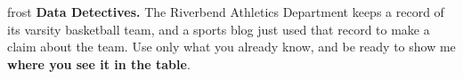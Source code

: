 \documentclass[12pt]{article}
\begin{document}

\vspace{0.06in}

\begin{headlinebox}{frost}
\textbf{Data Detectives.} The Riverbend Athletics Department keeps a record of its varsity
basketball team, and a sports blog just used that record to make a claim about the team. Use
only what you already know, and be ready to show me \textbf{where you see it in the table}.
\end{headlinebox}

\vspace{0.04in}
\end{document}
